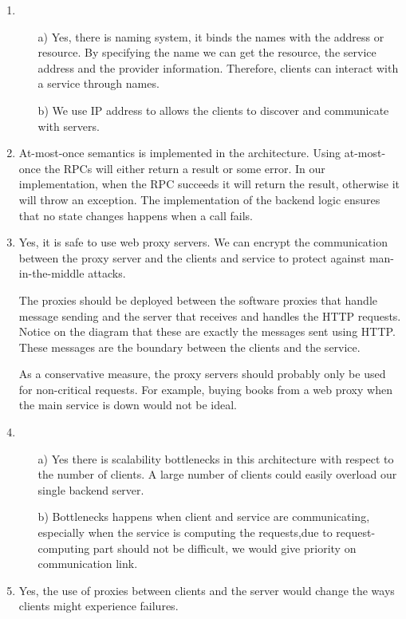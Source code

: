 \documentclass[11pt]{article}
\begin{document}
\begin{enumerate}
\begin{itemize}
    \end{itemize}
  \item
    \begin{itemize}
      \item[a)]
        Yes, there is naming system, it binds the names with the address or
        resource.  By specifying the name  we can get the resource, the service
        address and the provider information. Therefore, clients can interact with a
        service through names.

      \item[b)]
        We use IP address to allows the clients to discover and communicate with
        servers.
    \end{itemize}
  \item
    At-most-once semantics is implemented in the architecture. Using at-most-once
    the RPCs will either return a result or some error. In our
    implementation, when the RPC succeeds it will return the result, otherwise it
    will throw an exception. The implementation of the backend logic ensures
    that no state changes happens when a call fails.
  \item
    Yes, it is safe to use web proxy servers. We can encrypt the
    communication between the proxy server and the clients and service to
    protect against man-in-the-middle attacks. 

    The proxies should be deployed between the software proxies that handle
    message sending and the server that receives and handles the HTTP requests.
    Notice on the diagram that these are exactly the messages sent using HTTP.
    These messages are the boundary between the clients and the service.

    As a conservative measure, the proxy servers should probably only be used
    for non-critical requests. For example, buying books from a web proxy when
    the main service is down would not be ideal.
  \item
   \begin{itemize}
      \item[a)]
    Yes there is scalability bottlenecks in this architecture with respect to the
    number of clients. A large number of clients could easily overload our
    single backend server. 
      \item[b)]
     Bottlenecks happens when client and service are communicating, especially 
     when the service is computing the requests,due to request-computing part 
     should not be difficult, we would give priority on communication link.
     \end{itemize}    
  \item
    Yes, the use of proxies between clients and the server would change the ways
    clients might experience failures.
    

\end{enumerate}
\end{document}
